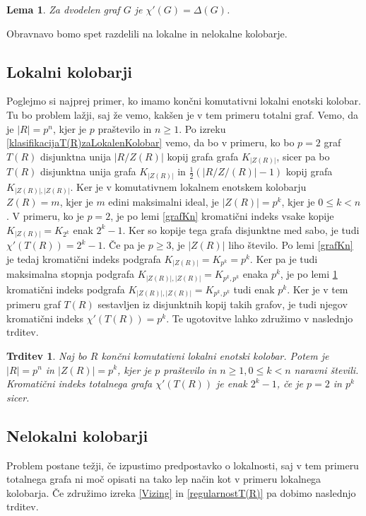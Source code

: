 \documentclass[a4paper, 12pt]{amsart}
\theoremstyle{definition} %
\theoremstyle{plain} %
\newtheorem{lema}[definicija]{Lema}
\newtheorem{trditev}[definicija]{Trditev}
\begin{document}
\begin{lema}
\label{dvodelenGraf}
Za dvodelen graf $G$ je $\chi'(G) = \Delta(G)$.
\end{lema}
Obravnavo bomo spet razdelili na lokalne in nelokalne kolobarje.

\subsection{Lokalni kolobarji}
Poglejmo si najprej primer, ko imamo končni komutativni lokalni enotski kolobar.  Tu bo problem lažji, saj že vemo, kakšen je v tem primeru totalni graf. Vemo, da je $|R| = p^n$, kjer je $p$ praštevilo in $n\ge 1$. Po izreku \ref{klasifikacijaT(R)zaLokalenKolobar} vemo, da bo v primeru, ko bo $p=2$ graf $T(R)$ disjunktna unija $|R/Z(R)|$ kopij grafa grafa $K_{|Z(R)|}$, sicer pa bo $T(R)$ disjunktna unija grafa $K_{|Z(R)|}$ in $\frac{1}{2}(|R/Z/(R)| - 1)$ kopij grafa $K_{|Z(R)|,|Z(R)|}$. Ker je v komutativnem lokalnem enotskem kolobarju $Z(R) = m$, kjer je $m$ edini maksimalni ideal, je $|Z(R)| = p^k$, kjer je $0 \le k < n$. V primeru, ko je $p=2$, je po lemi \ref{grafKn} kromatični indeks vsake kopije $K_{|Z(R)|} = K_{2^k}$ enak $2^k -1$. Ker so kopije tega grafa disjunktne med sabo, je tudi $\chi'(T(R)) = 2^k - 1$. Če pa je $p\ge 3$, je $|Z(R)|$ liho število. Po lemi \ref{grafKn} je tedaj kromatični indeks podgrafa $K_{|Z(R)|} = K_{p^k} = p^k$. Ker pa je tudi maksimalna stopnja podgrafa $K_{|Z(R)|,|Z(R)|} = K_{p^k,p^k}$ enaka $p^k$, je po lemi \ref{dvodelenGraf} kromatični indeks podgrafa $K_{|Z(R)|,|Z(R)|} = K_{p^k,p^k}$ tudi enak $p^k$. Ker je v tem primeru graf $T(R)$ sestavljen iz disjunktnih kopij takih grafov, je tudi njegov kromatični indeks $\chi'(T(R)) = p^k$. Te ugotovitve lahko združimo v naslednjo trditev.

\begin{trditev}
\label{kromaticniIndeksT(R)zaLokalniKolobar}
Naj bo $R$ končni komutativni lokalni enotski kolobar. Potem je $|R|=p^n$ in $|Z(R)| = p^k$, kjer je $p$ praštevilo in $n\ge 1, 0 \le k < n$  naravni števili. Kromatični indeks totalnega grafa $\chi'(T(R))$ je enak $2^k -1$, če je $p=2$ in $p^k$ sicer.
\end{trditev}

\subsection{Nelokalni kolobarji}
Problem postane težji, če izpustimo predpostavko o lokalnosti, saj v tem primeru totalnega grafa ni moč opisati na tako lep način kot v primeru lokalnega kolobarja. Če združimo izreka \ref{Vizing} in \ref{regularnostT(R)} pa dobimo naslednjo trditev.
\end{document}
